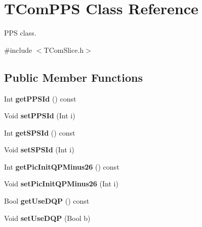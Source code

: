 \hypertarget{class_t_com_p_p_s}{}\section{T\+Com\+P\+PS Class Reference}
\label{class_t_com_p_p_s}


P\+PS class.  




{\ttfamily \#include $<$T\+Com\+Slice.\+h$>$}

\subsection*{Public Member Functions}
\begin{DoxyCompactItemize}
\item 
\mbox{\label{class_t_com_p_p_s_a76a392eb4a851a3d6f6ee9a9b68f1f87}} 
Int {\bfseries get\+P\+P\+S\+Id} () const
\item 
\mbox{\label{class_t_com_p_p_s_ab524f9aa8affe07d05f653dccfc58d88}} 
Void {\bfseries set\+P\+P\+S\+Id} (Int i)
\item 
\mbox{\label{class_t_com_p_p_s_aa714a323e0cb60c1c283b7d8175c9282}} 
Int {\bfseries get\+S\+P\+S\+Id} () const
\item 
\mbox{\label{class_t_com_p_p_s_a9323f3d021047148f0089d459ec7c238}} 
Void {\bfseries set\+S\+P\+S\+Id} (Int i)
\item 
\mbox{\label{class_t_com_p_p_s_ac851aee9b9a39a641db0965efda4aaee}} 
Int {\bfseries get\+Pic\+Init\+Q\+P\+Minus26} () const
\item 
\mbox{\label{class_t_com_p_p_s_a8bf7b8c8030e5f0a9e3b3f34edec5893}} 
Void {\bfseries set\+Pic\+Init\+Q\+P\+Minus26} (Int i)
\item 
\mbox{\label{class_t_com_p_p_s_ae46109765f9090307fa7c63b65b8f6eb}} 
Bool {\bfseries get\+Use\+D\+QP} () const
\item 
\mbox{\label{class_t_com_p_p_s_a74ba8da0f4c8ceb0484f93aff85c952f}} 
Void {\bfseries set\+Use\+D\+QP} (Bool b)
\item 

\end{DoxyCompactItemize}

